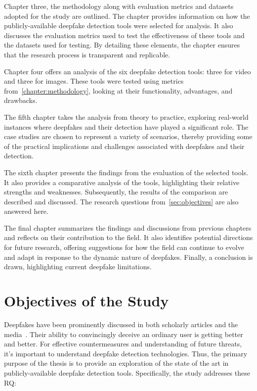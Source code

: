Chapter three, the methodology along with evaluation metrics and datasets
adopted for the study are outlined. The chapter provides information on how
the publicly-available deepfake detection tools were selected for analysis.
It also discusses the evaluation metrics used to test the effectiveness of these
tools and the datasets used for testing. By detailing these elements, the chapter
ensures that the research process is transparent and replicable.

Chapter four offers an analysis of the six deepfake detection tools: three for video
and three for images. These tools were tested using metrics from~\autoref{chapter:methodology},
looking at their functionality, advantages, and drawbacks.

The fifth chapter takes the analysis from theory to practice, exploring real-world instances
where deepfakes and their detection have played a significant role. The case studies
are chosen to represent a variety of scenarios, thereby providing some of the
practical implications and challenges associated with deepfakes and their
detection.

The sixth chapter presents the findings from the evaluation of the selected tools.
It also provides a comparative analysis of the tools, highlighting their relative
strengths and weaknesses. Subsequently, the results of the comparison are described
and discussed. The research questions from~\autoref{sec:objectives} are also answered here.

The final chapter summarizes the findings and discussions from previous chapters and
reflects on their contribution to the field. It also identifies potential directions
for future research, offering suggestions for how the field can continue to evolve
and adapt in response to the dynamic nature of deepfakes. Finally, a conclusion is drawn,
highlighting current deepfake limitations.

\section{Objectives of the Study}\label{sec:objectives}
Deepfakes have been prominently discussed in both scholarly articles and the media~\cite{forbes-2020,guardian-2019}.
Their ability to convincingly deceive an ordinary user is getting better and better.
For effective countermeasures and understanding of future threats, it's important to understand
deepfake detection technologies. Thus, the primary purpose of the thesis is to provide
an exploration of the state of the art in publicly-available deepfake detection tools.
Specifically, the study addresses these \ac{RQ}:

